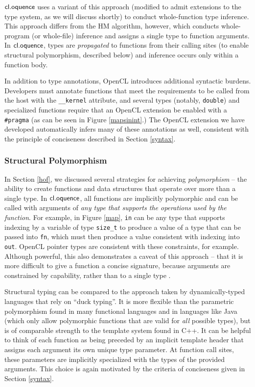 \documentclass[10pt, conference, compsocconf]{IEEEtran}
\begin{document}
$\textsf{cl.oquence}$ uses a variant of this approach (modified to admit extensions to the type system, as we will discuss shortly) to conduct whole-function type inference. This approach differs from the HM algorithm, however, which conducts whole-program (or whole-file) inference and assigns a single type to function arguments. In $\textsf{cl.oquence}$, types are {\it propagated} to functions from their calling sites (to enable structural polymorphism, described below) and inference occurs only within a function body.

In addition to type annotations, OpenCL introduces additional syntactic burdens. Developers must annotate functions that meet the requirements to be called from the host with the \verb|__kernel| attribute, and several types (notably, \verb|double|) and specialized functions require that an OpenCL extension be enabled with a \verb|#pragma| (as  can be seen in Figure \ref{mapsinint}.) The OpenCL extension we have developed automatically infers many of these annotations as well, consistent with the principle of conciseness described in Section \ref{syntax}.

\subsubsection{Structural Polymorphism}
In Section \ref{hof}, we discussed several strategies for achieving {\it polymorphism} -- the ability to create functions and data structures that operate over more than a single type. In $\textsf{cl.oquence}$, all functions are implicitly polymorphic and can be called with arguments of {\it any type that supports the operations used by the function}. For example, in Figure \ref{map}, \verb|in| can be any type that supports indexing by a variable of type \verb|size_t| to produce a value of a type that can be passed into \verb|fn|, which must then produce a value consistent with indexing into \verb|out|. OpenCL pointer types are consistent with these constraints, for example. Although powerful, this also demonstrates a caveat of this approach -- that it is more difficult to give a function a concise signature, because arguments are constrained by capability, rather than to a single type \cite{malayeri2009structural}.

Structural typing can be compared to the approach taken by dynamically-typed languages that rely on ``duck typing''. It is more flexible than the parametric polymorphism found in many functional languages and in languages like Java (which only allow polymorphic functions that are valid for {\it all} possible types), but is of comparable strength to the template system found in C++. It can be helpful to think of each function as being preceded by an implicit template header that assigns each argument its own unique type parameter. At function call sites, these parameters are implicitly specialized with the types of the provided arguments. This choice is again motivated by the criteria of conciseness given in Section \ref{syntax}.
\end{document}
